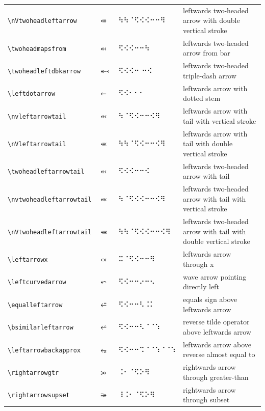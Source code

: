 \documentclass[oneside]{article}
\begin{document}
\begin{longtable}{llll}
\verb|\nVtwoheadleftarrow| & $\nVtwoheadleftarrow$ &   ⠳⠳⠈⠫⠪⠪⠒⠒⠻   & {leftwards two-headed arrow with double vertical stroke} \\[2ex]
\verb|\twoheadmapsfrom| & $\twoheadmapsfrom$ &   ⠫⠪⠪⠒⠒⠳   & {leftwards two-headed arrow from bar} \\[2ex]
\verb|\twoheadleftdbkarrow| & $\twoheadleftdbkarrow$ &   ⠫⠪⠪⠒ ⠒⠪   & {leftwards two-headed triple-dash arrow} \\[2ex]
\verb|\leftdotarrow| & $\leftdotarrow$ &   ⠫⠪⠂⠂⠂   & {leftwards arrow with dotted stem} \\[2ex]
\verb|\nvleftarrowtail| & $\nvleftarrowtail$ &   ⠳⠈⠫⠪⠒⠒⠪⠻   & {leftwards arrow with tail with vertical stroke} \\[2ex]
\verb|\nVleftarrowtail| & $\nVleftarrowtail$ &   ⠳⠳⠈⠫⠪⠒⠒⠪⠻   & {leftwards arrow with tail with double vertical stroke} \\[2ex]
\verb|\twoheadleftarrowtail| & $\twoheadleftarrowtail$ &   ⠫⠪⠪⠒⠒⠪   & {leftwards two-headed arrow with tail} \\[2ex]
\verb|\nvtwoheadleftarrowtail| & $\nvtwoheadleftarrowtail$ &   ⠳⠈⠫⠪⠪⠒⠒⠪⠻   & {leftwards two-headed arrow with tail with vertical stroke} \\[2ex]
\verb|\nVtwoheadleftarrowtail| & $\nVtwoheadleftarrowtail$ &   ⠳⠳⠈⠫⠪⠪⠒⠒⠪⠻   & \begin{minipage}[t]{8cm}{leftwards two-headed arrow with tail with double vertical stroke}
\end{minipage}\\[4ex]
\verb|\leftarrowx| & $\leftarrowx$ &   ⠭⠈⠫⠪⠒⠒⠻   & {leftwards arrow through x} \\[2ex]
\verb|\leftcurvedarrow| & $\leftcurvedarrow$ &   ⠫⠪⠒⠒⠔⠒⠢   & {wave arrow pointing directly left} \\[2ex]
\verb|\equalleftarrow| & $\equalleftarrow$ &   ⠫⠪⠒⠒⠣⠨⠅   & {equals sign above leftwards arrow} \\[2ex]
\verb|\bsimilarleftarrow| & $\bsimilarleftarrow$ &   ⠫⠪⠒⠒⠣⠈⠈⠱   & {reverse tilde operator above leftwards arrow} \\[2ex]
\verb|\leftarrowbackapprox| & $\leftarrowbackapprox$ &   ⠫⠪⠒⠒⠩⠈⠈⠱⠈⠈⠱   & {leftwards arrow above reverse almost equal to} \\[2ex]
\verb|\rightarrowgtr| & $\rightarrowgtr$ &   ⠨⠂⠈⠫⠕⠻   & {rightwards arrow through greater-than} \\[2ex]
\verb|\rightarrowsupset| & $\rightarrowsupset$ &   ⠸⠨⠂⠈⠫⠕⠻   & {rightwards arrow through subset} \\[2ex]

\end{longtable}
\end{document}
